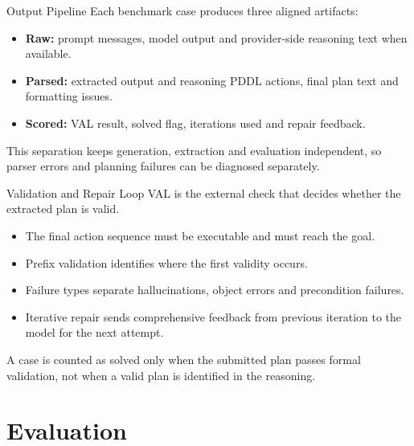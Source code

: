 \documentclass{beamer}
\begin{document}
\begin{frame}{Output Pipeline}\footnotesize
    Each benchmark case produces three aligned artifacts:

    \vspace{0.25cm}
    \begin{itemize}
        \item \textbf{Raw:} prompt messages, model output and provider-side reasoning text when available.
        \item \textbf{Parsed:} extracted output and reasoning PDDL actions, final plan text and formatting issues.
        \item \textbf{Scored:} VAL result, solved flag, iterations used and repair feedback.
    \end{itemize}

    \vspace{0.35cm}
    This separation keeps generation, extraction and evaluation independent, so parser errors and planning failures can be diagnosed separately.
\end{frame}

\begin{frame}{Validation and Repair Loop}\footnotesize
    VAL is the external check that decides whether the extracted plan is valid.

    \vspace{0.25cm}
    \begin{itemize}
        \item The final action sequence must be executable and must reach the goal.
        \item Prefix validation identifies where the first validity occurs.
        \item Failure types separate hallucinations, object errors and precondition failures.
        \item Iterative repair sends comprehensive feedback from previous iteration to the model for the next attempt.
    \end{itemize}

    \vspace{0.3cm}
    A case is counted as solved only when the submitted plan passes formal validation, not when a valid plan is identified in the reasoning.
\end{frame}

\section{Evaluation}
\end{document}

